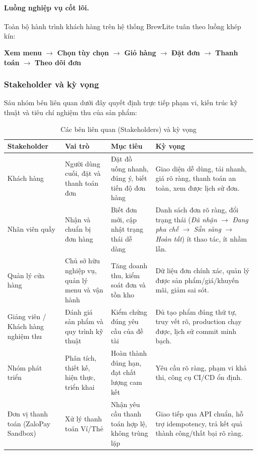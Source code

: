 \paragraph{Luồng nghiệp vụ cốt lõi.}
Toàn bộ hành trình khách hàng trên hệ thống BrewLite tuân theo luồng khép kín:
\begin{center}
\textbf{Xem menu} $\longrightarrow$ \textbf{Chọn tùy chọn} $\longrightarrow$ \textbf{Giỏ hàng} $\longrightarrow$ \textbf{Đặt đơn} $\longrightarrow$ \textbf{Thanh toán} $\longrightarrow$ \textbf{Theo dõi đơn}
\end{center}

\subsubsection{Stakeholder và kỳ vọng}

Sáu nhóm bên liên quan dưới đây quyết định trực tiếp phạm vi, kiến trúc kỹ thuật và tiêu chí nghiệm thu của sản phẩm:

\begin{table}[H]
\centering\small
\caption{Các bên liên quan (Stakeholders) và kỳ vọng}
\label{tab:stakeholders}
\begin{tabularx}{\textwidth}{@{}p{3.2cm} p{3.2cm} p{3.8cm} X@{}}
\toprule
\textbf{Stakeholder} & \textbf{Vai trò} & \textbf{Mục tiêu} & \textbf{Kỳ vọng} \\
\midrule
Khách hàng & Người dùng cuối, đặt và thanh toán đơn & Đặt đồ uống nhanh, đúng ý, biết tiến độ đơn hàng & Giao diện dễ dùng, tải nhanh, giá rõ ràng, thanh toán an toàn, xem được lịch sử đơn. \\
Nhân viên quầy & Nhận và chuẩn bị đơn hàng & Biết đơn mới, cập nhật trạng thái dễ dàng & Danh sách đơn rõ ràng, đổi trạng thái (\textit{Đã nhận} $\rightarrow$ \textit{Đang pha chế} $\rightarrow$ \textit{Sẵn sàng} $\rightarrow$ \textit{Hoàn tất}) ít thao tác, ít nhầm lẫn. \\
Quản lý cửa hàng & Chủ sở hữu nghiệp vụ, quản lý menu và vận hành & Tăng doanh thu, kiểm soát đơn và tồn kho & Dữ liệu đơn chính xác, quản lý được sản phẩm/giá/khuyến mãi, giảm sai sót. \\
Giảng viên / Khách hàng nghiệm thu & Đánh giá sản phẩm và quy trình kỹ thuật & Kiểm chứng đúng yêu cầu của đề tài & Đủ tạo phẩm đúng thứ tự, truy vết rõ, production chạy được, lịch sử commit minh bạch. \\
Nhóm phát triển & Phân tích, thiết kế, hiện thực, triển khai & Hoàn thành đúng hạn, đạt chất lượng cam kết & Yêu cầu rõ ràng, phạm vi khả thi, công cụ CI/CD ổn định. \\
Đơn vị thanh toán (ZaloPay Sandbox) & Xử lý thanh toán Ví/Thẻ & Nhận yêu cầu thanh toán hợp lệ, không trùng lặp & Giao tiếp qua API chuẩn, hỗ trợ idempotency, trả kết quả thành công/thất bại rõ ràng. \\
\bottomrule
\end{tabularx}
\end{table}

